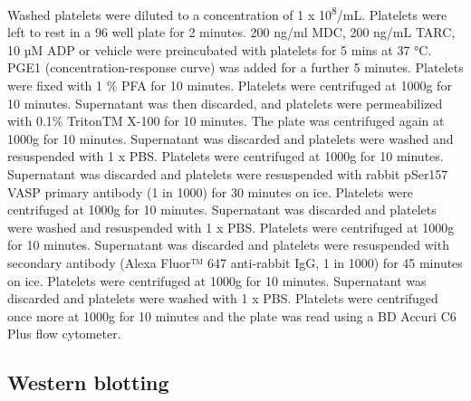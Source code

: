 \documentclass[11pt,twoside]{bristolthesis}
\begin{document}
Washed platelets were diluted to a concentration of 1 x 10\textsuperscript{8}/mL. Platelets were left to rest in a 96 well plate for 2 minutes. 200 ng/ml MDC, 200 ng/mL TARC, 10 µM ADP or vehicle were preincubated with platelets for 5 mins at 37 °C. PGE1 (concentration-response curve) was added for a further 5 minutes. Platelets were fixed with 1 \% PFA for 10 minutes. Platelets were centrifuged at 1000g for 10 minutes. Supernatant was then discarded, and platelets were permeabilized with 0.1\% TritonTM X-100 for 10 minutes. The plate was centrifuged again at 1000g for 10 minutes. Supernatant was discarded and platelets were washed and resuspended with 1 x PBS. Platelets were centrifuged at 1000g for 10 minutes. Supernatant was discarded and platelets were resuspended with rabbit pSer157 VASP primary antibody (1 in 1000) for 30 minutes on ice. Platelets were centrifuged at 1000g for 10 minutes. Supernatant was discarded and platelets were washed and resuspended with 1 x PBS. Platelets were centrifuged at 1000g for 10 minutes. Supernatant was discarded and platelets were resuspended with secondary antibody (Alexa Fluor™ 647 anti-rabbit IgG, 1 in 1000) for 45 minutes on ice. Platelets were centrifuged at 1000g for 10 minutes. Supernatant was discarded and platelets were washed with 1 x PBS. Platelets were centrifuged once more at 1000g for 10 minutes and the plate was read using a BD Accuri C6 Plus flow cytometer.

\hypertarget{western-blotting}{%
\subsection{Western blotting}\label{western-blotting}}
\end{document}
